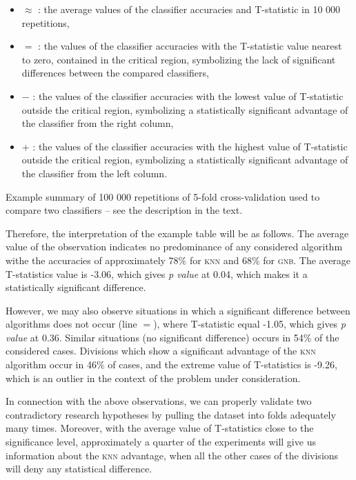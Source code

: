 \documentclass[final,3p,times,onecolumn]{elsarticle}
\begin{document}
\begin{itemize}
	\item $\approx$ : the average values of the classifier accuracies and T-statistic in 10 000 repetitions,
	\item $=$ : the values of the classifier accuracies with the T-statistic value nearest to zero, contained in the critical region, symbolizing the lack of significant differences between the compared classifiers,
	\item $-$ : the values of the classifier accuracies with the lowest value of T-statistic outside the critical region, symbolizing a statistically significant advantage of the classifier from the right column,
	\item $+$ : the values of the classifier accuracies with the highest value of T-statistic outside the critical region, symbolizing a statistically significant advantage of the classifier from the left column.
\end{itemize}


\begin{table}[!h]
	\centering
	\caption{Example summary of 100 000 repetitions of 5-fold cross-validation used to compare two classifiers – see the description in the text.}
	\label{tab:example}


\end{table}

Therefore, the interpretation of the example table will be as follows. The average value of the observation indicates no predominance of any considered algorithm withe the accuracies of approximately 78\% for \textsc{knn} and 68\% for \textsc{gnb}. The average T-statistics value is -3.06, which gives \emph{p value} at 0.04, which makes it a statistically significant difference.

However, we may also observe situations in which a significant difference between algorithms does not occur (line $=$), where T-statistic equal -1.05, which gives \emph{p value} at 0.36. Similar situations (no significant difference) occurs in 54\% of the considered cases. Divisions which show a significant advantage of the \textsc{knn} algorithm occur in 46\% of cases, and the extreme value of T-statistics is -9.26, which is an outlier in the context of the problem under consideration.

In connection with the above observations, we can properly validate two contradictory research hypotheses by pulling the dataset into folds adequately many times. Moreover, with the average value of T-statistics close to the significance level, approximately a quarter of the experiments will give us information about the \textsc{knn} advantage, when all the other cases of the divisions will deny any statistical difference.
\end{document}
